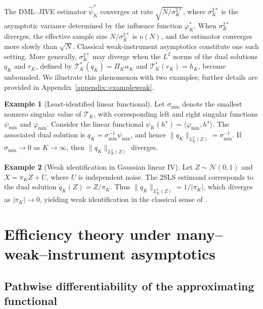 \documentclass[11pt]{article}
\theoremstyle{plain}
\theoremstyle{definition}
\newtheorem{example}{Example}
\theoremstyle{remark}
\theoremstyle{definition}
\begin{document}
The DML--JIVE estimator $\widehat{\psi}_K^*$ converges at rate $\sqrt{N/\sigma_K^{2*}}$, where
$\sigma_K^{2*}$ is the asymptotic variance determined by the influence
function $\varphi_K^*$. When $\sigma_K^{2*}$ diverges, the effective sample size
$N/\sigma_K^{2*}$ is $o(N)$, and the estimator converges more slowly than
$\sqrt{N}$. Classical weak-instrument asymptotics \citep{bound1995problems} constitute one such
setting. More generally, $\sigma_K^{2*}$ may diverge when the $L^2$ norms of the
dual solutions $q_K$ and $r_K$, defined by $\mathcal{T}_K^*(q_K)=\Pi_K\alpha_K$ and
$\mathcal{T}_K^*(r_K)=h_K$, become unbounded. We illustrate this phenomenon with two examples; further details are provided in
Appendix~\ref{appendix::exampleweak}.

\begin{example}[Least-identified linear functional]
Let $\sigma_{\min}$ denote the smallest nonzero singular value of
$\mathcal{T}_K$, with corresponding left and right singular functions
$\psi_{\min}$ and $\varphi_{\min}$. Consider the linear functional
$\psi_K(h^\star)=\langle \varphi_{\min}, h^\star \rangle$. The associated dual
solution is $q_K=\sigma_{\min}^{-1}\psi_{\min}$, and hence
$\|q_K\|_{L^2_K(Z)}=\sigma_{\min}^{-1}$. If $\sigma_{\min}\to 0$ as
$K \to \infty$, then $\|q_K\|_{L^2_K(Z)}$ diverges.
\end{example}


\begin{example}[Weak identification in Gaussian linear IV]
Let $Z\sim\mathcal{N}(0,1)$ and $X=\pi_K Z+U$, where $U$ is independent noise. The 2SLS estimand corresponds to the dual solution $q_K(Z)=Z/\pi_K$.
Thus $\|q_K\|_{L^2_K(Z)}=1/|\pi_K|$, which diverges as $|\pi_K|\to 0$, yielding
weak identification in the classical sense of \citet{bound1995problems}.
\end{example}

 



\section{Efficiency theory under many--weak--instrument asymptotics}
 
\label{sec:efficiency}
 


\subsection{Pathwise differentiability of the approximating functional}
\label{sec::theorypathwise}
\end{document}

